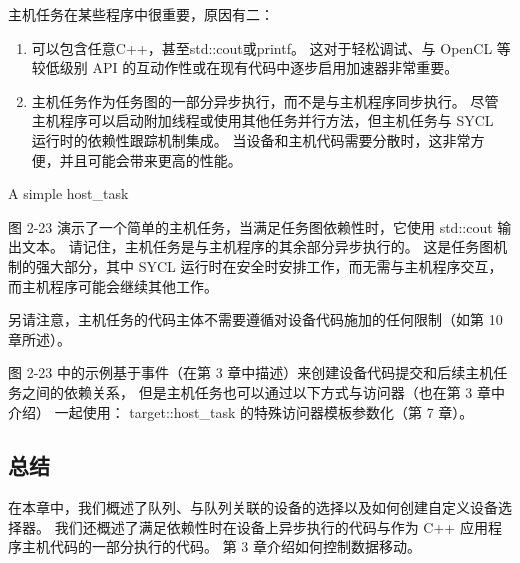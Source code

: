 主机任务在某些程序中很重要，原因有二：
\begin{enumerate}
	\item 可以包含任意C++，甚至std::cout或printf。 
	这对于轻松调试、与 OpenCL 等较低级别 API 的互动作性或在现有代码中逐步启用加速器非常重要。

	\item 主机任务作为任务图的一部分异步执行，而不是与主机程序同步执行。 
	尽管主机程序可以启动附加线程或使用其他任务并行方法，但主机任务与 SYCL 运行时的依赖性跟踪机制集成。 
	当设备和主机代码需要分散时，这非常方便，并且可能会带来更高的性能。
\end{enumerate}

{\color{red} A simple host\_task }

图 2-23 演示了一个简单的主机任务，当满足任务图依赖性时，它使用 std::cout 输出文本。 
请记住，主机任务是与主机程序的其余部分异步执行的。 
这是任务图机制的强大部分，其中 SYCL 运行时在安全时安排工作，而无需与主机程序交互，而主机程序可能会继续其他工作。

另请注意，主机任务的代码主体不需要遵循对设备代码施加的任何限制（如第 10 章所述）。

图 2-23 中的示例基于事件（在第 3 章中描述）来创建设备代码提交和后续主机任务之间的依赖关系，
但是主机任务也可以通过以下方式与访问器（也在第 3 章中介绍）
一起使用： target::host\_task 的特殊访问器模板参数化（第 7 章）。

\subsection{总结}
在本章中，我们概述了队列、与队列关联的设备的选择以及如何创建自定义设备选择器。 
我们还概述了满足依赖性时在设备上异步执行的代码与作为 C++ 应用程序主机代码的一部分执行的代码。 
第 3 章介绍如何控制数据移动。